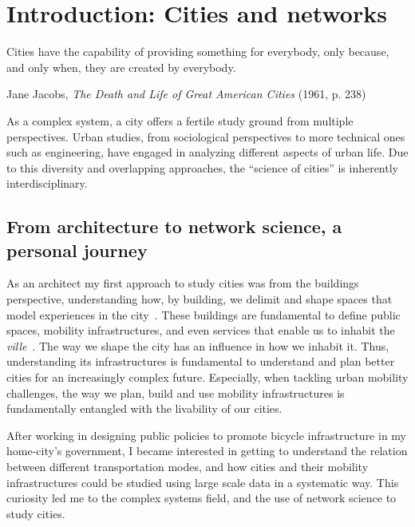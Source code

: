 \chapter{Introduction: Cities and networks}

\epigraph{Cities have the capability of providing something for everybody, only because, and only when, they are created by everybody.}{Jane Jacobs, \textit{The Death and Life of Great American Cities} (1961, p. 238)}

As a complex system, a city offers a fertile study ground from multiple perspectives. Urban studies, from sociological perspectives to more technical ones such as engineering, have engaged in analyzing different aspects of urban life. Due to this diversity and overlapping approaches, the ``science of cities'' is inherently interdisciplinary.

\section{From architecture to network science, a personal journey}

As an architect my first approach to study cities was from the buildings perspective, understanding how, by building, we delimit and shape spaces that model experiences in the city~\cite{gehl1971life}. These buildings are fundamental to define public spaces, mobility infrastructures, and even services that enable us to inhabit the \textit{ville}~\cite{sennett2018building}. The way we shape the city has an influence in how we inhabit it. Thus, understanding its infrastructures is fundamental to understand and plan better cities for an increasingly complex future. Especially, when tackling urban mobility challenges, the way we plan, build and use mobility infrastructures is fundamentally entangled with the livability of our cities.

After working in designing public policies to promote bicycle infrastructure in my home-city's government, I became interested in getting to understand the relation between different transportation modes, and how cities and their mobility infrastructures could be studied using large scale data in a systematic way. This curiosity led me to the complex systems field, and the use of network science to study cities.

